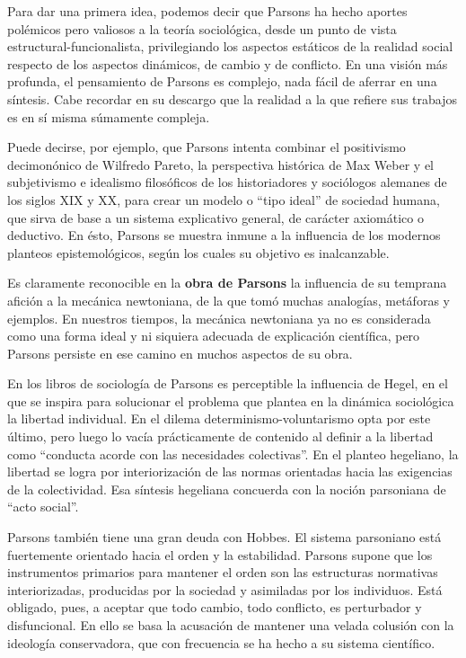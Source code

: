 \documentclass[
]{book}
\begin{document}
Para dar una primera idea, podemos decir que Parsons ha hecho aportes polémicos pero valiosos a la teoría sociológica, desde un punto de vista estructural-funcionalista, privilegiando los aspectos estáticos de la realidad social respecto de los aspectos dinámicos, de cambio y de conflicto. En una visión más profunda, el pensamiento de Parsons es complejo, nada fácil de aferrar en una síntesis. Cabe recordar en su descargo que la realidad a la que refiere sus trabajos es en sí misma súmamente compleja.

Puede decirse, por ejemplo, que Parsons intenta combinar el positivismo decimonónico de Wilfredo Pareto, la perspectiva histórica de Max Weber y el subjetivismo e idealismo filosóficos de los historiadores y sociólogos alemanes de los siglos XIX y XX, para crear un modelo o ``tipo ideal'' de sociedad humana, que sirva de base a un sistema explicativo general, de carácter axiomático o deductivo. En ésto, Parsons se muestra inmune a la influencia de los modernos planteos epistemológicos, según los cuales su objetivo es inalcanzable.

Es claramente reconocible en la \textbf{obra de Parsons} la influencia de su temprana afición a la mecánica newtoniana, de la que tomó muchas analogías, metáforas y ejemplos. En nuestros tiempos, la mecánica newtoniana ya no es considerada como una forma ideal y ni siquiera adecuada de explicación científica, pero Parsons persiste en ese camino en muchos aspectos de su obra.

En los libros de sociología de Parsons es perceptible la influencia de Hegel, en el que se inspira para solucionar el problema que plantea en la dinámica sociológica la libertad individual. En el dilema determinismo-voluntarismo opta por este último, pero luego lo vacía prácticamente de contenido al definir a la libertad como ``conducta acorde con las necesidades colectivas''. En el planteo hegeliano, la libertad se logra por interiorización de las normas orientadas hacia las exigencias de la colectividad. Esa síntesis hegeliana concuerda con la noción parsoniana de ``acto social''.

Parsons también tiene una gran deuda con Hobbes. El sistema parsoniano está fuertemente orientado hacia el orden y la estabilidad. Parsons supone que los instrumentos primarios para mantener el orden son las estructuras normativas interiorizadas, producidas por la sociedad y asimiladas por los individuos. Está obligado, pues, a aceptar que todo cambio, todo conflicto, es perturbador y disfuncional. En ello se basa la acusación de mantener una velada colusión con la ideología conservadora, que con frecuencia se ha hecho a su sistema científico.
\end{document}
